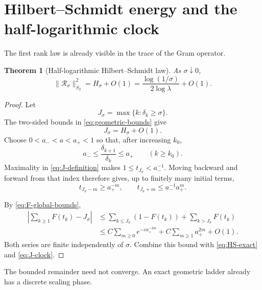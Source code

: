 \documentclass[11pt]{article}
\newtheorem{theorem}{Theorem}[section]
\theoremstyle{definition}
\theoremstyle{remark}
\newcommand{\cR}{\mathcal R}
\begin{document}
\section{Hilbert--Schmidt energy and the half-logarithmic clock}
\label{sec:HS-law}

The first rank law is already visible in the trace of the Gram operator.

\begin{theorem}[Half-logarithmic Hilbert--Schmidt law]
\label{thm:HS-law}
As $\sigma\downarrow0$,
\begin{equation}\label{eq:HS-law}
 \boxed{
 \|\cR_\sigma\|_{S_2}^2
 =H_\sigma+O(1)
 =\frac{\log(1/\sigma)}{2\log\lambda}+O(1).}
\end{equation}
\end{theorem}

\begin{proof}
Let
\begin{equation}\label{eq:J-definition}
 J_\sigma=\max\{k:\delta_k\ge\sigma\}.
\end{equation}
The two-sided bounds in \eqref{eq:geometric-bounds} give
\begin{equation}\label{eq:J-clock}
 J_\sigma=H_\sigma+O(1).
\end{equation}
Choose $0<a_-<a<a_+<1$ so that, after increasing $k_0$,
\begin{equation}\label{eq:ratio-bracket}
 a_-\le\frac{\delta_{k+1}}{\delta_k}\le a_+
 \qquad(k\ge k_0).
\end{equation}
Maximality in \eqref{eq:J-definition} makes
$1\le t_{J_\sigma}<a_-^{-1}$.  Moving backward and forward from that index
therefore gives, up to finitely many initial terms,
\begin{equation}\label{eq:t-geometric}
 t_{J_\sigma-m}\ge a_+^{-m},
 \qquad
 t_{J_\sigma+m}\le a_-^{-1}a_+^m.
\end{equation}

By \eqref{eq:F-global-bounds},
\begin{align*}
 \left|
 \sum_{k\ge1}F(t_k)-J_\sigma
 \right|
 &\le
 \sum_{k\le J_\sigma}(1-F(t_k))
 +\sum_{k>J_\sigma}F(t_k)\\
 &\le C\sum_{m\ge0}e^{-c a_+^{-2m}}
 +C\sum_{m\ge1}a_+^{2m}+O(1).
\end{align*}
Both series are finite independently of $\sigma$.  Combine this bound with
\eqref{eq:HS-exact} and \eqref{eq:J-clock}.
\end{proof}

The bounded remainder need not converge.  An exact geometric ladder already
has a discrete scaling phase.
\end{document}
